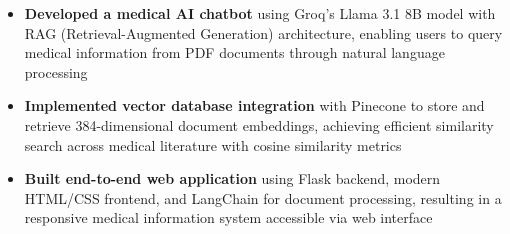 
\begin{itemize}
    \item \textbf{Developed a medical AI chatbot} using Groq's Llama 3.1 8B model with RAG (Retrieval-Augmented Generation) architecture, enabling users to query medical information from PDF documents through natural language processing
    
    \item \textbf{Implemented vector database integration} with Pinecone to store and retrieve 384-dimensional document embeddings, achieving efficient similarity search across medical literature with cosine similarity metrics
    
    \item \textbf{Built end-to-end web application} using Flask backend, modern HTML/CSS frontend, and LangChain for document processing, resulting in a responsive medical information system accessible via web interface
\end{itemize}
